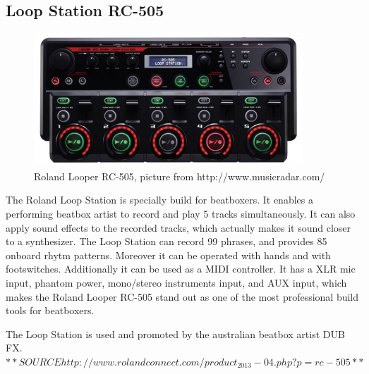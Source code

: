 \subsection{ Loop Station RC-505 }
\begin{figure}[h]
	\begin{center}
		\includegraphics[height=5cm]{fig/Roland-RC-505.JPG}
		\caption{Roland Looper RC-505, picture from http://www.musicradar.com/}
		\label{Looper}
	\end{center}
\end{figure}
The Roland Loop Station is specially build for beatboxers. It enables a performing beatbox artist to record and play 5 tracks simultaneously. It can also apply sound effects to the recorded tracks, which actually makes it sound closer to a synthesizer. The Loop Station can record 99 phrases, and provides 85 onboard rhytm patterns. Moreover it can be operated with hands and with footswitches. Additionally it can be used as a MIDI controller. It has a XLR mic input, phantom power, mono/stereo instruments input, and AUX input, which makes the Roland Looper RC-505 stand out as one of the most professional build tools for beatboxers.

The Loop Station is used and promoted by the australian beatbox artist DUB FX.$**SOURCE http://www.rolandconnect.com/product_2013-04.php?p=rc-505 **$


